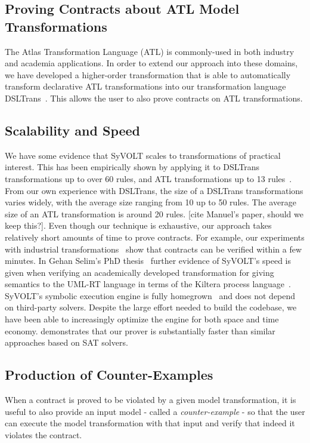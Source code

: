 \subsection{Proving Contracts about ATL Model Transformations}
The Atlas Transformation Language (ATL) is commonly-used in both industry and
academia applications. In order to extend our approach into these domains, we
have developed a higher-order transformation that is able to automatically
transform declarative ATL transformations into our transformation language
DSLTrans~\cite{Oakes}. This allows the user to also prove contracts on
ATL transformations.

\subsection{Scalability and Speed}

We have some evidence that SyVOLT scales to transformations of practical
interest. This has been empirically shown by applying it to DSLTrans
transformations up to over 60 rules, and ATL transformations up to 13
rules~\cite{Oakes}. From our own experience with DSLTrans, the size of a
DSLTrans transformations varies widely, with the average size ranging from 10 up
to 50 rules. The average size of an ATL transformation is around 20 rules. [cite
Manuel's paper, should we keep this?].
Even though our technique is exhaustive, our approach takes relatively short
amounts of time to prove contracts. For example, our experiments with industrial
transformations~\cite{Oakes} show that contracts can be verified within a few
minutes. In Gehan Selim's PhD thesis~\cite{Selim2015}
further evidence of SyVOLT's speed is given when verifying an
academically developed transformation for giving semantics to the UML-RT language in terms of
the Kiltera process language~\cite{PosseDingel2014}. SyVOLT's symbolic execution
engine is fully homegrown~\cite{LucioVang} and does not depend on third-party
solvers.
Despite the large effort needed to build the codebase, we have been able to
increasingly optimize the engine for both space and time economy.
\cite{Selim2014} demonstrates that our prover is substantially faster than
similar approaches based on SAT solvers.


\subsection{Production of Counter-Examples}

When a contract is proved to be violated by a given model transformation, it is
useful to also provide an input model - called a \emph{counter-example} - so
that the user can execute the model transformation with that input and verify
that indeed it violates the contract.

